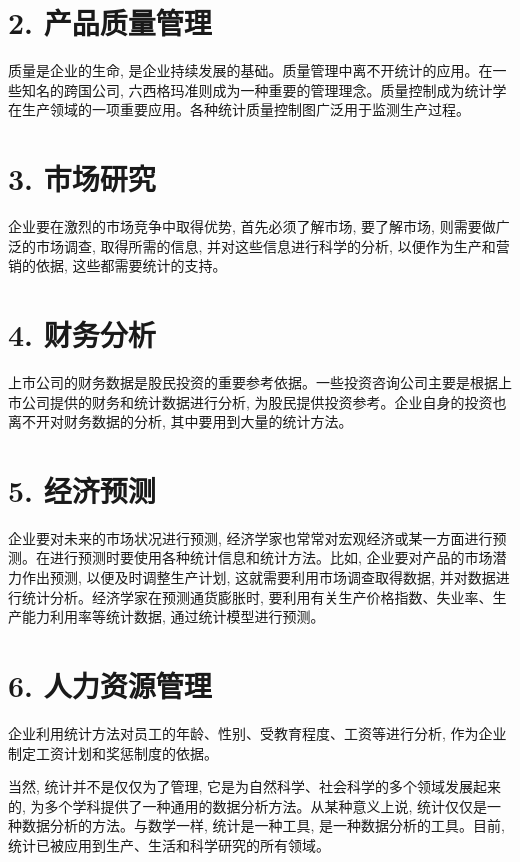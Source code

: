 \documentclass[10pt]{article}
\begin{document}
\begin{CJK*}{UTF8}{bsmi}
\section*{2. 产品质量管理}
质量是企业的生命, 是企业持续发展的基础。质量管理中离不开统计的应用。在一些知名的跨国公司, 六西格玛准则成为一种重要的管理理念。质量控制成为统计学在生产领域的一项重要应用。各种统计质量控制图广泛用于监测生产过程。

\section*{3. 市场研究}
企业要在激烈的市场竞争中取得优势, 首先必须了解市场, 要了解市场, 则需要做广泛的市场调查, 取得所需的信息, 并对这些信息进行科学的分析, 以便作为生产和营销的依据, 这些都需要统计的支持。

\section*{4. 财务分析}
上市公司的财务数据是股民投资的重要参考依据。一些投资咨询公司主要是根据上市公司提供的财务和统计数据进行分析, 为股民提供投资参考。企业自身的投资也离不开对财务数据的分析, 其中要用到大量的统计方法。

\section*{5. 经济预测}
企业要对未来的市场状况进行预测, 经济学家也常常对宏观经济或某一方面进行预测。在进行预测时要使用各种统计信息和统计方法。比如, 企业要对产品的市场潜力作出预测, 以便及时调整生产计划, 这就需要利用市场调查取得数据, 并对数据进行统计分析。经济学家在预测通货膨胀时, 要利用有关生产价格指数、失业率、生产能力利用率等统计数据, 通过统计模型进行预测。

\section*{6. 人力资源管理}
企业利用统计方法对员工的年龄、性别、受教育程度、工资等进行分析, 作为企业制定工资计划和奖惩制度的依据。

当然, 统计并不是仅仅为了管理, 它是为自然科学、社会科学的多个领域发展起来的, 为多个学科提供了一种通用的数据分析方法。从某种意义上说, 统计仅仅是一种数据分析的方法。与数学一样, 统计是一种工具, 是一种数据分析的工具。目前, 统计已被应用到生产、生活和科学研究的所有领域。


\end{CJK*}
\end{document}
